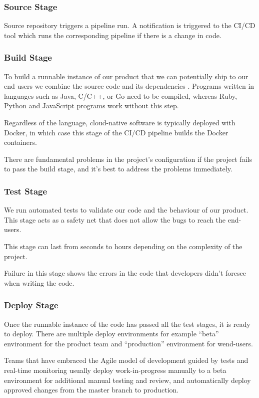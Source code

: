 \subsubsection{Source Stage}
Source repository triggers a pipeline run. A notification is triggered to the CI/CD tool 
which runs the corresponding pipeline  if there is a change in code. 

\subsubsection{Build Stage}
To build a runnable instance of our product that we can potentially ship to our end users we combine 
the source code and its dependencies . Programs written in languages such as Java, C/C++, or Go need 
to be compiled, whereas Ruby, Python and JavaScript programs work without this step.

Regardless of the language, cloud-native software is typically deployed with Docker, in which case this 
stage of the CI/CD pipeline builds the Docker containers.

There are fundamental problems in the project's configuration if the project fails to pass the build 
stage, and it’s best to address the problems  immediately.

\subsubsection{Test Stage}
We run automated tests to validate our code and the behaviour of our product. This stage acts as a safety
net that does not allow the bugs to reach the end-users.

This stage can last from seconds  to  hours depending on the complexity of the project.

Failure in this stage shows the errors in the code that developers didn't foresee when writing the code.

\subsubsection{Deploy Stage}
Once the runnable instance of the code has passed all the test stages, it is ready to deploy. There are 
multiple deploy environments for example “beta” environment for the product team and “production” environment 
for wend-users.

Teams that have embraced the Agile model of development guided by tests and real-time monitoring usually 
deploy work-in-progress manually to a beta environment for additional manual testing and review, and 
automatically deploy approved changes from the master branch to production.

